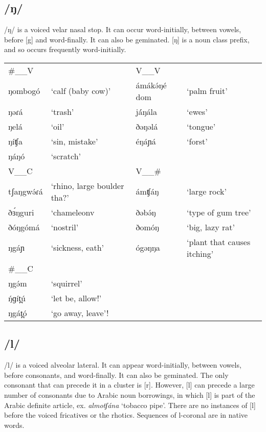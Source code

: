 \subsection{/ŋ/}
/ŋ/ is a voiced velar nasal stop. It can occur word-initially, between vowels, before [g] and word-finally. It can also be geminated. [ŋ] is a noun class prefix, and so occurs frequently word-initially. 
\ea
\begin{tabular}[t]{lp{3cm}lp{3cm}}
\#\_\_V	&&	V\_\_V		\\
ŋombogó	&‘calf (baby cow)’		&ámákə́ŋé	dom &‘palm fruit’\\
ŋəɾá	&‘trash’				&já́ŋála		&‘ewes’\\
ŋelá	&‘oil’					&ðəŋəlá	&‘tongue’\\
ŋíʧa	&‘sin, mistake’			&éŋáɲá	&‘forst’\\
ŋáŋó	&‘scratch’		\\	
\midrule
V\_\_C	&&		V\_\_\# 	\\
\midrule
tʃaŋgwə́ɾá	&‘rhino, large boulder tha?’		&ámʧáŋ	&‘large rock’\\
ðɜ́ŋguri	&‘chameleonv		&ðəbə́ŋ	&‘type of gum tree’\\
ðóŋgómá	&‘nostril’			&ðomóŋ	&‘big, lazy rat’\\
ŋgáɲ	&‘sickness, eath’	&ógəŋŋa	&‘plant that causes itching’\\
\midrule
\#\_\_C\\
\midrule
ŋgə́m		&‘squirrel’			\\
ŋ́ɡít̪ú	&‘let be, allow!’	\\		
ŋgát̪ó	&‘go away, leave’!	
\end{tabular}\label{ex:ch2:35}		
\z

\subsection{/l/}
/l/ is a voiced alveolar lateral. It can appear word-initially, between vowels, before consonants, and word-finally. It can also be geminated. The only consonant that can precede it in a cluster is [r]. However, [l] can precede a large number of consonants due to Arabic noun borrowings, in which [l] is part of the Arabic definite article, ex. \textit{almotʃána} ‘tobacco pipe’. There are no instances of [l] before the voiced fricatives or the rhotics. Sequences of l-coronal are in native words.  

